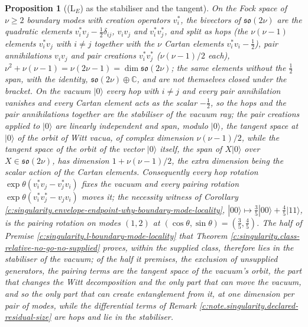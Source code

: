 \documentclass[11pt]{article}
\newtheorem{proposition}[theorem]{Proposition}
\theoremstyle{definition}
\theoremstyle{plain}
\providecommand{\C}{}\renewcommand{\C}{\mathbb{C}}
\begin{document}
\begin{proposition}[(L$_E$) as the stabiliser and the tangent]\label{c:singularity.l-stabiliser-tangent}
On the Fock space of $\nu \geq 2$ boundary modes with creation operators $v^*_i$, the bivectors of $\mathfrak{so}(2\nu)$ are the quadratic elements $v^*_i v_j - \tfrac12\delta_{ij}$, $v_i v_j$ and $v^*_i v^*_j$, and split as hops (the $\nu(\nu - 1)$ elements $v^*_i v_j$ with $i \neq j$ together with the $\nu$ Cartan elements $v^*_i v_i - \tfrac12$), pair annihilations $v_i v_j$ and pair creations $v^*_i v^*_j$ ($\nu(\nu - 1)/2$ each), $\nu^2 + \nu(\nu - 1) = \nu(2\nu - 1) = \dim\mathfrak{so}(2\nu)$; the same elements without the $\tfrac12$ span, with the identity, $\mathfrak{so}(2\nu) \oplus \C$, and are not themselves closed under the bracket. On the vacuum $|0\rangle$ every hop with $i \neq j$ and every pair annihilation vanishes and every Cartan element acts as the scalar $-\tfrac12$, so the hops and the pair annihilations together are the stabiliser of the vacuum ray; the pair creations applied to $|0\rangle$ are linearly independent and span, modulo $|0\rangle$, the tangent space at $|0\rangle$ of the orbit of Witt vacua, of complex dimension $\nu(\nu - 1)/2$, while the tangent space of the orbit of the vector $|0\rangle$ itself, the span of $X|0\rangle$ over $X \in \mathfrak{so}(2\nu)$, has dimension $1 + \nu(\nu - 1)/2$, the extra dimension being the scalar action of the Cartan elements. Consequently every hop rotation $\exp\theta(v^*_i v_j - v^*_j v_i)$ fixes the vacuum and every pairing rotation $\exp\theta(v^*_i v^*_j - v_j v_i)$ moves it; the necessity witness of Corollary \ref{c:singularity.envelope-endpoint-why-boundary-mode-locality}, $|00\rangle \mapsto \tfrac35|00\rangle + \tfrac45|11\rangle$, is the pairing rotation on modes $(1,2)$ at $(\cos\theta, \sin\theta) = (\tfrac35, \tfrac45)$. The half of Premise \ref{c:singularity.l-boundary-mode-locality} that Theorem \ref{c:singularity.class-relative-no-go-no-supplied} proves, within the supplied class, therefore lies in the stabiliser of the vacuum; of the half it premises, the exclusion of unsupplied generators, the pairing terms are the tangent space of the vacuum's orbit, the part that changes the Witt decomposition and the only part that can move the vacuum, and so the only part that can create entanglement from it, at one dimension per pair of modes, while the differential terms of Remark \ref{c:note.singularity.declared-residual-size} are hops and lie in the stabiliser.
\end{proposition}
\end{document}
